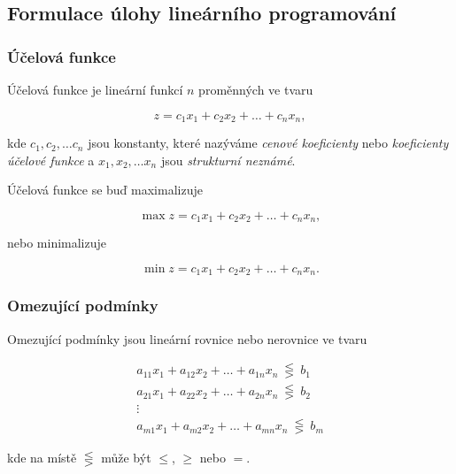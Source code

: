 \subsection{Formulace úlohy lineárního programování}

\subsubsection{Účelová funkce}


Účelová funkce je lineární funkcí $n$ proměnných ve tvaru

\begin{equation}
    z = c_1x_1 + c_2x_2 + \ldots + c_nx_n ,
\end{equation}


kde $c_1, c_2, \ldots c_n$ jsou konstanty, které nazýváme \textit{cenové koeficienty} nebo \textit{koeficienty účelové funkce} a 
$x_1, x_2, \ldots x_n$ jsou \textit{strukturní neznámé}.

Účelová funkce se buď maximalizuje

\begin{equation}
    \max z = c_1x_1 + c_2x_2 + \ldots + c_nx_n ,
\end{equation}

nebo minimalizuje

\begin{equation}
    \min z = c_1x_1 + c_2x_2 + \ldots + c_nx_n .
\end{equation}

\subsubsection{Omezující podmínky}

Omezující podmínky jsou lineární rovnice nebo nerovnice ve tvaru

\begin{equation}
    \begin{gathered}
        a_{11}x_1 + a_{12}x_2 + \ldots + a_{1n}x_n \ \lesseqgtr \ b_1 \\
        a_{21}x_1 + a_{22}x_2 + \ldots + a_{2n}x_n \ \lesseqgtr \ b_2 \\
        \vdots \\
        a_{m1}x_1 + a_{m2}x_2 + \ldots + a_{mn}x_n \ \lesseqgtr \ b_m
    \end{gathered}
\end{equation}

kde na místě $\lesseqgtr$ může být $\leq$, $\geq$ nebo $=$.

